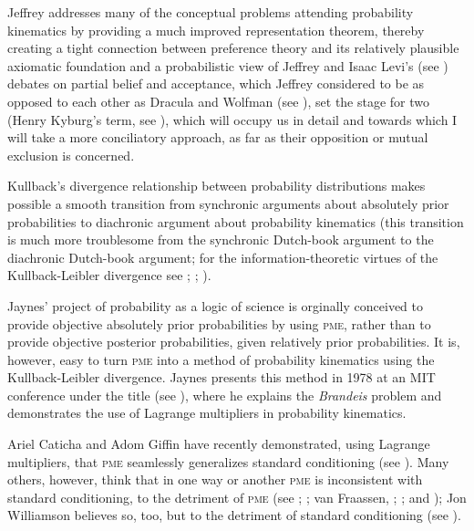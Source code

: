 \documentclass[phd,12pt,oneside]{ubcthesis}
\begin{document}
Jeffrey addresses many of the conceptual problems attending
probability kinematics by providing a much improved representation
theorem, thereby creating a tight connection between preference theory
and its relatively plausible axiomatic foundation and a probabilistic
view of  Jeffrey and Isaac Levi's (see
) debates on partial belief and acceptance, which
Jeffrey considered to be as opposed to each other as Dracula and
Wolfman (see ), set the stage for two
 (Henry Kyburg's term, see
), which will occupy us in detail and towards
which I will take a more conciliatory approach, as far as their
opposition or mutual exclusion is concerned.

Kullback's divergence relationship between probability distributions
makes possible a smooth transition from synchronic arguments about
absolutely prior probabilities to diachronic argument about
probability kinematics (this transition is much more troublesome from
the synchronic Dutch-book argument to the diachronic Dutch-book
argument; for the information-theoretic virtues of the
Kullback-Leibler divergence see ;
; ).

Jaynes' project of probability as a logic of science is orginally
conceived to provide objective absolutely prior probabilities by using
\textsc{pme}, rather than to provide objective posterior
probabilities, given relatively prior probabilities. It is, however,
easy to turn \textsc{pme} into a method of probability kinematics
using the Kullback-Leibler divergence. Jaynes presents this method in
1978 at an MIT conference under the title  (see ), where he explains
the \emph{Brandeis} problem and demonstrates the use of Lagrange
multipliers in probability kinematics.

Ariel Caticha and Adom Giffin have recently demonstrated, using
Lagrange multipliers, that \textsc{pme} seamlessly generalizes
standard conditioning (see ). Many others,
however, think that in one way or another \textsc{pme} is
inconsistent with standard conditioning, to the detriment of
\textsc{pme} (see ;
; van Fraassen, ;
; and ); Jon
Williamson believes so, too, but to the detriment of standard
conditioning (see ).
\end{document}
